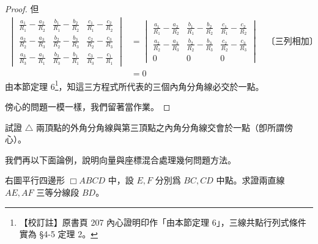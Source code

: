 \begin{proof}
但
\begin{align*}
\begin{vmatrix}
\frac{a_1}{R_1} - \frac{a_2}{R_2} & \frac{b_1}{R_1} - \frac{b_2}{R_2} & \frac{c_1}{R_1} - \frac{c_2}{R_2} \\
\frac{a_2}{R_2} - \frac{a_3}{R_3} & \frac{b_2}{R_2} - \frac{b_3}{R_3} & \frac{c_2}{R_2} - \frac{c_3}{R_3} \\
\frac{a_3}{R_3} - \frac{a_1}{R_1} & \frac{b_3}{R_3} - \frac{b_1}{R_1} & \frac{c_3}{R_3} - \frac{c_1}{R_1}
\end{vmatrix}
&= \begin{vmatrix}
\frac{a_1}{R_1} - \frac{a_2}{R_2} & \frac{b_1}{R_1} - \frac{b_2}{R_2} & \frac{c_1}{R_1} - \frac{c_2}{R_2} \\
\frac{a_2}{R_2} - \frac{a_3}{R_3} & \frac{b_2}{R_2} - \frac{b_3}{R_3} & \frac{c_2}{R_2} - \frac{c_3}{R_3} \\
0 & 0 & 0
\end{vmatrix} \quad \text{〔三列相加〕} \\
&= 0
\end{align*}
由本節定理 6\footnote{\label{note:b3-ch4-p207-theorem-ref}【校訂註】原書頁 207 內心證明印作「由本節定理 6」，三線共點行列式條件實為 \S 4-5 定理 2。}，知這三方程式所代表的三個內角分角線必交於一點。

傍心的問題一模一樣，我們留著當作業。 \qedhere
\end{proof}

\begin{exercise}[*作業 31]
試證 $\triangle$ 兩頂點的外角分角線與第三頂點之內角分角線交會於一點（卽所謂傍心）。
\end{exercise}

我們再以下面論例，說明向量與座標混合處理幾何問題方法。

\begin{example}[論例 8]
右圖平行四邊形 $\Box ABCD$ 中，設 $E, F$ 分別爲 $BC, CD$ 中點。求證兩直線 $AE, AF$ 三等分線段 $BD$。
\end{example}

